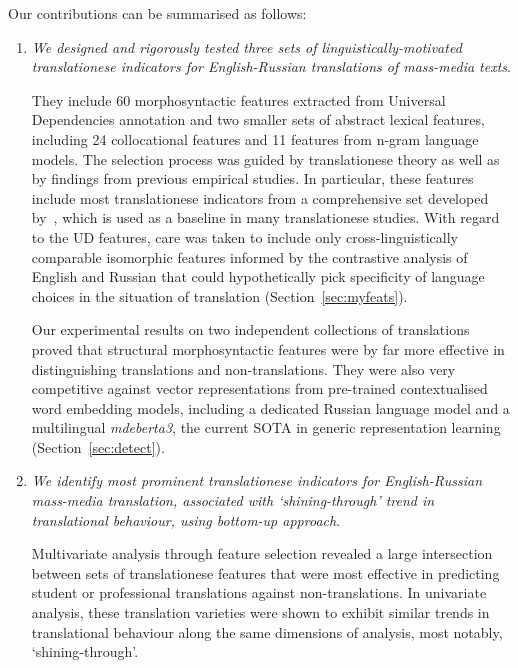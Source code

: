 Our contributions can be summarised as follows: %
\begin{enumerate}\compresslist{}
	\item \textit{We designed and rigorously tested three sets of linguistically-motivated translationese indicators for English-Russian translations of mass-media texts}. 
	
	They include 60 morphosyntactic features extracted from Universal Dependencies annotation and two smaller sets of abstract lexical features, including 24 collocational features and 11 features from n-gram language models. The selection process was guided by translationese theory as well as by findings from previous empirical studies. In particular, these features include most translationese indicators from a comprehensive set developed by~\citet{Volansky2015}, which is used as a baseline in many translationese studies. With regard to the UD features, care was taken to include only cross-linguistically comparable isomorphic features informed by the contrastive analysis of English and Russian that could hypothetically pick specificity of language choices in the situation of translation (Section~\ref{sec:myfeats}). 
	
	Our experimental results on two independent collections of translations proved that structural morphosyntactic features were by far more effective in distinguishing translations and non-translations. They were also very competitive against vector representations from pre-trained contextualised word embedding models, including a dedicated Russian language model and a multilingual \textit{mdeberta3}, the current SOTA in generic representation learning (Section~\ref{sec:detect}).      
	
	\item \textit{We identify most prominent translationese indicators for English-Russian mass-media translation, associated with `shining-through' trend in translational behaviour, using bottom-up approach}. 
	
	Multivariate analysis through feature selection revealed a large intersection between sets of translationese features that were most effective in predicting student or professional translations against non-translations. In univariate analysis, these translation varieties were shown to exhibit similar trends in translational behaviour along the same dimensions of analysis, most notably, `shining-through'.
	

\end{enumerate}
